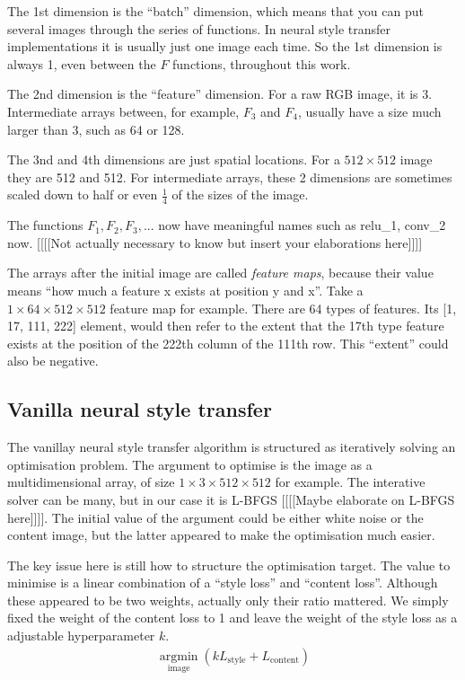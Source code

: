 \documentclass[runningheads]{llncs}
\DeclareMathOperator*{\argmin}{argmin}
\begin{document}
The 1st dimension is the ``batch'' dimension, which means that you can put several images through the
series of functions.
In neural style transfer implementations it is usually just one image each time.
So the 1st dimension is always 1, even between the $F$ functions, throughout this work.

The 2nd dimension is the ``feature'' dimension. For a raw RGB image, it is 3.
Intermediate arrays between, for example, $F_3$ and $F_4$, usually 
have a size much larger than 3, such as 64 or 128.

The 3nd and 4th dimensions are just spatial locations. 
For a $512\times512$ image they are 512 and 512. 
For intermediate arrays, these 2 dimensions are sometimes scaled down
to half or even $\frac{1}{4}$ of the sizes of the image.

The functions $F_1,F_2,F_3,...$ now have meaningful names such as relu\_1, conv\_2 now.
[[[[Not actually necessary to know but insert your elaborations here]]]]

The arrays after the initial image are called \emph{feature maps}, because their value means
``how much a feature x exists at position y and x''.
Take a $1\times64\times512\times512$ feature map for example. There are 64 types of features.
Its [1, 17, 111, 222] element, would then refer to the extent that the 17th type feature exists
at the position of the 222th column of the 111th row. This ``extent'' could also be negative.

\subsection{Vanilla neural style transfer}

The vanillay neural style transfer algorithm \cite{nst} is 
structured as iteratively solving an optimisation problem.
The argument to optimise is the image as a multidimensional array,
of size $1\times3\times512\times512$ for example.
The interative solver can be many, but in our case it is 
L-BFGS [[[[Maybe elaborate on L-BFGS here]]]]. 
The initial value of the argument could be either white noise or the content image,
but the latter appeared to make the optimisation much easier.

The key issue here is still how to structure the optimisation target.
The value to minimise is a linear combination of a ``style loss'' 
and ``content loss''.
Although these appeared to be two weights,
actually only their ratio mattered.
We simply fixed the weight of the content loss to 1 and
leave the weight of the style loss as a adjustable hyperparameter $k$.
\begin{align}
\argmin\limits_{\text{image}} (kL_\text{style}+L_\text{content})
\end{align}
\end{document}
